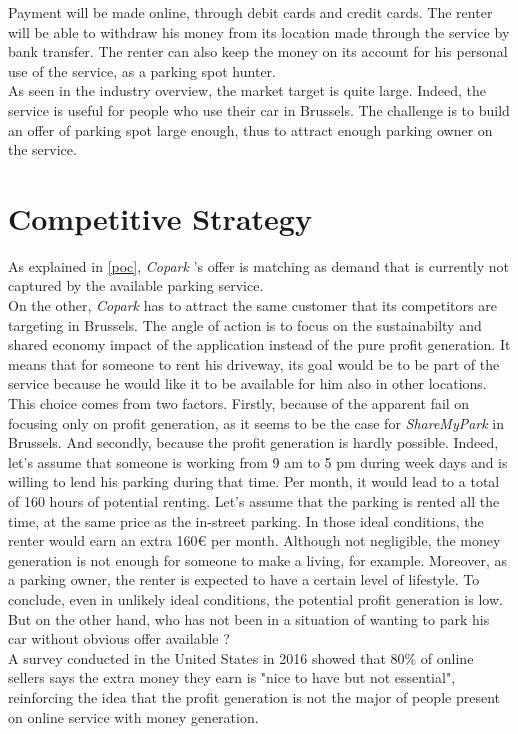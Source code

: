 \documentclass[12pt,a4paper,oneside]{book}
\newcommand{\bp}{\textit{Copark }}
\begin{document}
Payment will be made online, through debit cards and credit cards. The renter will be able to withdraw his money from its location made through the service by bank transfer. The renter can also keep the money on its account for his personal use of the service, as a parking spot hunter.\\

As seen in the industry overview, the market target is quite large. Indeed, the service is useful for people who use their car in Brussels. The challenge is to build an offer of parking spot large enough, thus to attract enough parking owner on the service.

\section{Competitive Strategy}
\label{cst}
As explained in \autoref{poc}, \bp's offer is matching as demand that is currently not captured by the available parking service.\\

On the other, \bp has to attract the same customer that its competitors are targeting in Brussels. The angle of action is to focus on the sustainabilty and shared economy impact of the application instead of the pure profit generation. It means that for someone to rent his driveway, its goal would be to be part of the service because he would like it to be available for him also in other locations.\\
This choice comes from two factors. Firstly, because of the apparent fail on focusing only on profit generation, as it seems to be the case for \textit{ShareMyPark} in Brussels. And secondly, because the profit generation is hardly possible. Indeed, let's assume that someone is working from 9 am to 5 pm during week days and is willing to lend his parking during that time. Per month, it would lead to a total of 160 hours of potential renting. Let's assume that the parking is rented all the time, at the same price as the in-street parking. In those ideal conditions, the renter would earn an extra 160\euro{}  per month. Although not negligible, the money generation is not enough for someone to make a living, for example. Moreover, as a parking owner, the renter is expected to have a certain level of lifestyle. To conclude, even in unlikely ideal conditions, the potential profit generation is low. But on the other hand, who has not been in a situation of wanting to park his car without obvious offer available ?\\
A survey conducted in the United States in 2016 showed that 80\% of online sellers says the extra money they earn is "nice to have but not essential"\cite{ospg}, reinforcing the idea that the profit generation is not the major of people present on online service with money generation.
\end{document}
